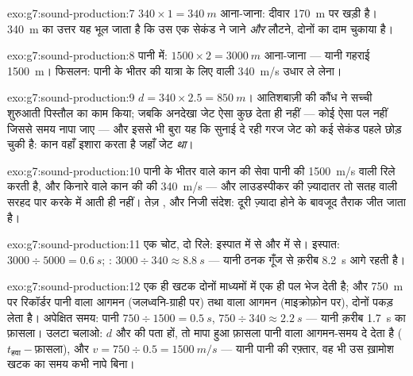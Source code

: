 \begin{solution}{exo:g7:sound-production:7}
$340 \times 1 = \qty{340}{m}$ आना-जाना: दीवार \qty{170}{m} पर खड़ी है।
\qty{340}{m} का उत्तर यह भूल जाता है कि उस एक सेकंड ने जाने
\emph{और} लौटने, दोनों का दाम चुकाया है।
\end{solution}

\begin{solution}{exo:g7:sound-production:8}
पानी में: $1500 \times 2 = \qty{3000}{m}$ आना-जाना --- यानी गहराई
\qty{1500}{m}। फिसलन: पानी के भीतर की यात्रा के लिए  वाली
\qty{340}{m/s} उधार ले लेना।
\end{solution}

\begin{solution}{exo:g7:sound-production:9}
$d = 340 \times 2.5 = \qty{850}{m}$। आतिशबाज़ी की कौंध ने सच्ची
शुरुआती पिस्तौल का काम किया; जबकि अनदेखा जेट ऐसा कुछ देता ही नहीं ---
कोई ऐसा पल नहीं जिससे समय नापा जाए --- और इससे भी बुरा यह कि सुनाई दे
रही गरज जेट को कई सेकंड पहले छोड़ चुकी है: कान वहाँ इशारा करता है जहाँ
जेट \emph{था}।
\end{solution}

\begin{solution}{exo:g7:sound-production:10}
पानी के भीतर वाले कान की सेवा पानी की \qty{1500}{m/s} वाली रिले करती
है, और किनारे वाले कान की  की \qty{340}{m/s} --- और लाउडस्पीकर की
ज़्यादातर  तो सतह वाली सरहद पार करके  में आती ही नहीं। तेज़
, और निजी संदेश: दूरी ज़्यादा होने के बावजूद तैराक जीत जाता है।
\end{solution}

\begin{solution}{exo:g7:sound-production:11}
एक चोट, दो रिले: इस्पात में से और  में से। इस्पात:
$3000 \div 5000 = \qty{0.6}{s}$; : $3000 \div 340 \approx
\qty{8.8}{s}$ --- यानी ठनक गूँज से क़रीब \qty{8.2}{s} आगे रहती है।
\end{solution}

\begin{solution}{exo:g7:sound-production:12}
एक ही खटक दोनों माध्यमों में एक ही पल भेज देती है; और \qty{750}{m} पर
रिकॉर्डर पानी वाला आगमन (जलध्वनि-ग्राही पर) तथा  वाला आगमन
(माइक्रोफ़ोन पर), दोनों पकड़ लेता है। अपेक्षित समय: पानी $750 \div
1500 = \qty{0.5}{s}$,  $750 \div 340 \approx \qty{2.2}{s}$ ---
यानी क़रीब \qty{1.7}{s} का फ़ासला। उलटा चलाओ: $d$ और  की  पता
हों, तो मापा हुआ फ़ासला पानी वाला आगमन-समय दे देता है
($t_{\text{हवा}} - \text{फ़ासला}$), और $v = 750 \div 0.5 =
\qty{1500}{m/s}$ --- यानी पानी की रफ़्तार, वह भी उस ख़ामोश खटक का समय
कभी नापे बिना।
\end{solution}

